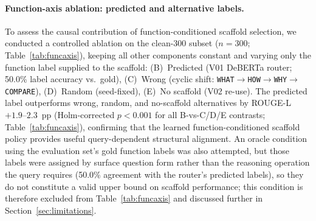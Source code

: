 \documentclass[a4paper,fleql,doubleblind]{cas-sc}
\begin{document}
\paragraph{Function-axis ablation: predicted and alternative labels.}
To assess the causal contribution of function-conditioned scaffold selection,
we conducted a controlled ablation on the clean-300 subset ($n{=}300$;
Table~\ref{tab:funcaxis}), keeping all other components constant and varying only the function label supplied to the scaffold:
(B)~Predicted (V01 DeBERTa router; 50.0\% label accuracy vs.\ gold),
(C)~Wrong (cyclic shift: \texttt{WHAT}$\to$\texttt{HOW}$\to$\texttt{WHY}$\to$\texttt{COMPARE}),
(D)~Random (seed-fixed),
(E)~No scaffold (V02 re-use).
The predicted label outperforms wrong, random, and no-scaffold alternatives by ROUGE-L $+1.9$--$2.3$~pp
(Holm-corrected $p{<}0.001$ for all B-vs-C/D/E contrasts; Table~\ref{tab:funcaxis}),
confirming that the learned function-conditioned scaffold policy provides useful query-dependent structural alignment.
An oracle condition using the evaluation set's gold function labels was also attempted, but
those labels were assigned by surface question form rather than the reasoning operation the
query requires (50.0\% agreement with the router's predicted labels), so they do not
constitute a valid upper bound on scaffold performance; this condition is therefore excluded
from Table~\ref{tab:funcaxis} and discussed further in Section~\ref{sec:limitations}.
\end{document}
